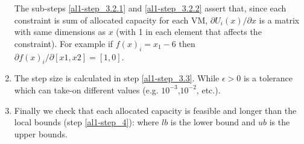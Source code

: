 \begin{enumerate}
 The sub-steps \ref{al1-step_3.2.1} and \ref{al1-step_3.2.2} assert that, since each constraint is sum of allocated capacity for each VM, $\partial U_i(x)/\partial x$ is a matrix with same dimensions as $x$ (with 1 in each element that affects the constraint). For example if $f(x)_i=x_1-6$ then $\partial f(x)_i/\partial [x1,x2]=[1,0]$. 

\item The step size is calculated in step \ref{al1-step_3.3}. While $\epsilon>0$ is a tolerance which can take-on different values (e.g. $10^{-3}$,$10^{-2}$, etc.). 

\item  Finally we check that each allocated capacity is feasible and longer than the local bounds (step \ref{al1-step_4}):
where $lb$ is the lower bound and $ub$ is the upper bounds.

\end{enumerate}



